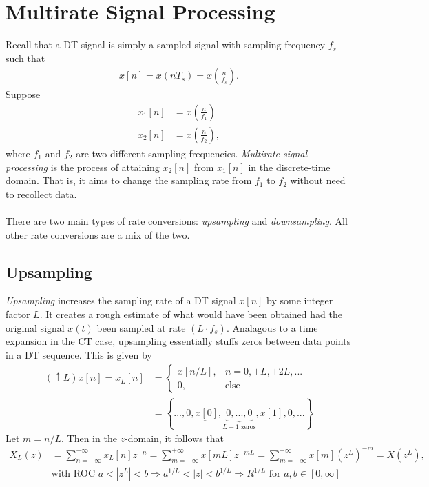 \documentclass{report}
\begin{document}
\section{Multirate Signal Processing}
Recall that a DT signal is simply a sampled signal with sampling frequency $f_s$ such that 
\begin{align}
    x[n] = x(nT_s) = x\left(\frac{n}{f_s}\right).
\end{align}
Suppose 
\begin{align}
    x_1[n] &= x\left(\frac{n}{f_1}\right) \\
    x_2[n] &= x\left(\frac{n}{f_2}\right),
\end{align}
where $f_1$ and $f_2$ are two different sampling frequencies. \emph{Multirate signal processing} is 
the process of attaining $x_2[n]$ from $x_1[n]$ in the discrete-time domain. That is, it aims to 
change the sampling rate from $f_1$ to $f_2$ without need to recollect data.
\\ \\
There are two main types of rate conversions: \emph{upsampling} and \emph{downsampling}. All other rate 
conversions are a mix of the two. 

\subsection{Upsampling}
\emph{Upsampling} increases the sampling rate of a DT signal $x[n]$ by some integer factor $L$. It creates a rough estimate of 
what would have been obtained had the original signal $x(t)$ been sampled at rate $(L\cdot f_s)$. Analagous to 
a time expansion in the CT case, upsampling essentially stuffs zeros between data points in a DT sequence. This is given by 
\begin{align}
    (\uparrow L)x[n] = x_L[n] &=
    \begin{cases}
        x[n/L], & n=0,\pm L,\pm 2L,... \\
        0, & \text{else}
    \end{cases} \\
    &= \left\{...,0,\underbar{x[0]}, \underbrace{0,...,0}_{L-1 \text{ zeros}}, x[1], 0, ...\right\}
\end{align}
Let $m=n/L$. Then in the $z$-domain, it follows that
\begin{align}
    X_L(z) &= \sum_{n=-\infty}^{+\infty} x_L[n]z^{-n} = \sum_{m=-\infty}^{+\infty} x[mL]z^{-mL} = \sum_{m=-\infty}^{+\infty} x[m](z^L)^{-m} = X(z^L), \\
    & \text{with ROC } a<|z^L|<b \Longrightarrow a^{1/L}<|z|<b^{1/L} \Longrightarrow R^{1/L} \text{ for } a,b\in[0,\infty] \nonumber
\end{align}
\end{document}
